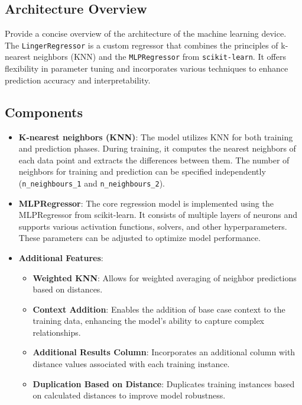 \documentclass[a4paper, 12pt]{report}
\begin{document}
\subsection{Architecture Overview}
Provide a concise overview of the architecture of the machine learning device.
The \texttt{LingerRegressor} is a custom regressor that combines the principles of k-nearest neighbors (KNN) and the \texttt{MLPRegressor} from \texttt{scikit-learn}. 
It offers flexibility in parameter tuning and incorporates various techniques to enhance prediction accuracy and interpretability.

\subsection{Components}

\begin{itemize}
    \item \textbf{K-nearest neighbors (KNN)}: The model utilizes KNN for both training and prediction phases. 
	During training, it computes the nearest neighbors of each data point and extracts the differences between them. 
	The number of neighbors for training and prediction can be specified independently (\texttt{n\_neighbours\_1} and \texttt{n\_neighbours\_2}).
    
    \item \textbf{MLPRegressor}: The core regression model is implemented using the MLPRegressor from scikit-learn. 
	It consists of multiple layers of neurons and supports various activation functions, solvers, and other hyperparameters. 
	These parameters can be adjusted to optimize model performance.
    
    \item \textbf{Additional Features}:
    \begin{itemize}
        \item \textbf{Weighted KNN}: Allows for weighted averaging of neighbor predictions based on distances.
        \item \textbf{Context Addition}: Enables the addition of base case context to the training data, enhancing the model's ability to capture complex relationships.
        \item \textbf{Additional Results Column}: Incorporates an additional column with distance values associated with each training instance.
        \item \textbf{Duplication Based on Distance}: Duplicates training instances based on calculated distances to improve model robustness.
    \end{itemize}
\end{itemize}
\end{document}
